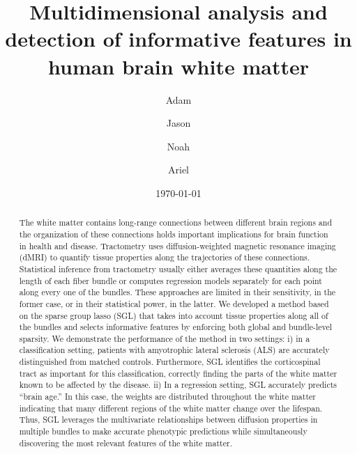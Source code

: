 \documentclass[10pt,%
               aps,%
               prl,%
               reprint,%
               superscriptaddress,%
               preprintnumbers,%
               linenumbers,%
               amsmath,%
               floatfix]{revtex4-1}
\begin{document}
\title{Multidimensional analysis and detection of informative features in human brain white matter}

\author{Adam }%
%

\author{Jason }%

\author{Noah }%

\author{Ariel }%

\date{\today}



\begin{abstract}
    The white matter contains long-range connections between different brain
    regions and the organization of these connections holds important
    implications for brain function in health and disease. Tractometry uses
    diffusion-weighted magnetic resonance imaging (dMRI) to quantify tissue
    properties along the trajectories of these connections.
    Statistical inference from tractometry usually either averages these
    quantities along the length of each fiber bundle or computes regression
    models separately for each point along every one of the bundles. These
    approaches are limited in their sensitivity, in the former case, or in
    their statistical power, in the latter. We developed a method based on
    the sparse group lasso (SGL)
    that takes into account tissue properties along all of the bundles and
    selects informative features by enforcing both global and bundle-level
    sparsity. We demonstrate the performance of the method in two settings:
    i) in a classification setting, patients with amyotrophic lateral
    sclerosis (ALS) are accurately distinguished from matched controls.
    Furthermore, SGL identifies the corticospinal tract as important for this
    classification, correctly finding the parts of the white matter known to
    be affected by the disease. ii) In a regression setting, SGL accurately
    predicts ``brain age.''
    In this case, the weights are distributed throughout the white matter
    indicating that many different regions of the white matter change over
    the lifespan. Thus, SGL leverages the multivariate relationships between
    diffusion properties in multiple bundles to make accurate phenotypic
    predictions while simultaneously discovering the most relevant features
    of the white matter.
\end{abstract}
\end{document}
